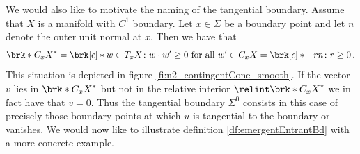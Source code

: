 We would also like to motivate the naming of the tangential boundary.
Assume that $X$ is a manifold with $C^1$ boundary.
Let $x\in\Sigma$ be a boundary point and let $n$ denote the outer unit normal at $x$.
Then we have that
\begin{align*}
  \brk*{C_xX}^*=\brk[c]*{w\in T_xX\colon w\cdot w'\geq0\text{ for all }w'\in C_xX}
  =\brk[c]*{-rn\colon r\geq0}\,.
\end{align*}
This situation is depicted in figure \ref{fi:n2_contingentCone_smooth}.
If the vector $v$ lies in $\brk*{C_xX}^*$ but not in the relative interior $\relint\brk*{C_xX}^*$
we in fact have that $v=0$. Thus the tangential boundary $\Sigma^0$ consists in this case of
precisely those boundary points at which $u$ is tangential to the boundary or vanishes.
% 
We would now like to illustrate definition \ref{df:emergentEntrantBd} with a more concrete example.
